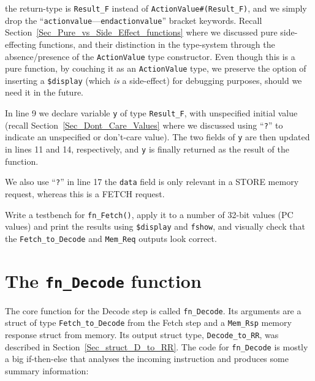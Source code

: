{\ie} the return-type is \verb|Result_F| instead of
\verb|ActionValue#(Result_F)|, and we simply drop the
``\verb|actionvalue|---\verb|endactionvalue|'' bracket
keywords. Recall Section~\ref{Sec_Pure_vs_Side_Effect_functions} where
we discussed pure {\vs} side-effecting functions, and their
distinction in the type-system through the absence/presence of the
\verb|ActionValue| type constructor.  Even though this is a pure
function, by couching it as an \verb|ActionValue| type, we preserve
the option of inserting a \verb|$display| (which \emph{is} a
side-effect) for debugging purposes, should we need it in the future.

In line 9 we declare variable \verb|y| of type \verb|Result_F|, with
unspecified initial value (recall Section~\ref{Sec_Dont_Care_Values}
where we discussed using ``\verb|?|'' to indicate an unspecified or
don't-care value).  The two fields of \verb|y| are then updated in
lines 11 and 14, respectively, and \verb|y| is finally returned as the
result of the function.

We also use ``\verb|?|'' in line 17 the \verb|data| field is only
relevant in a STORE memory request, whereas this is a FETCH request.


\hdivider

\Exercise

Write a testbench for \verb|fn_Fetch()|, apply it to a number of
32-bit values (PC values) and print the results using \verb|$display|
and \verb|fshow|, and visually check that the \verb|Fetch_to_Decode|
and \verb|Mem_Req| outputs look correct.

\Endexercise


\section{The {\tt fn\_Decode} function}

\label{Sec_fn_Decode}


The core function for the Decode step is called \verb|fn_Decode|.  Its
arguments are a struct of type \verb|Fetch_to_Decode| from the Fetch
step and a \verb|Mem_Rsp| memory response struct from memory.  Its
output struct type, \verb|Decode_to_RR|, was described in
Section~\ref{Sec_struct_D_to_RR}.  The code for \verb|fn_Decode| is
mostly a big if-then-else that analyses the incoming instruction and
produces some summary information:

